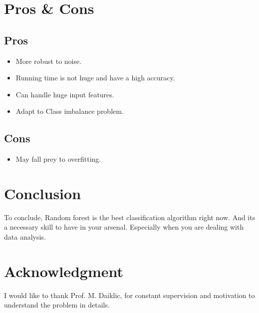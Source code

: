 \documentclass[journal]{IEEEtran}
\begin{document}
\section{Pros \& Cons}
\subsection{Pros}
\begin{itemize}
	\renewcommand{\labelitemi}{$\bullet$}
	\item More robust to noise.
	\item Running time is not huge and have a high accuracy.
	\item Can handle huge input features.
	\item Adapt to Class imbalance problem.
\end{itemize}

\subsection{Cons}
\begin{itemize}
	\renewcommand{\labelitemi}{$\bullet$}
	\item May fall prey to overfitting.
\end{itemize}



\section{Conclusion}
To conclude, Random forest is the best classification algorithm right now. And its a necessary skill to have in your arsenal. Especially when you are dealing with data analysis. 




\section*{Acknowledgment}
I would like to thank Prof. M. Daiklic, for constant supervision and motivation to understand the problem in details.

\ifCLASSOPTIONcaptionsoff
  \newpage
\fi
\end{document}
